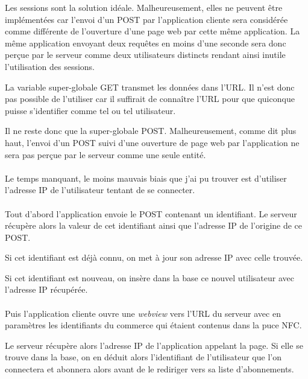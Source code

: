 \documentclass[a4paper,12pt,titlepage]{report}
\begin{document}
Les sessions sont la solution idéale. Malheureusement, elles ne peuvent être implémentées car l'envoi d'un POST par l'application cliente sera considérée comme différente de l'ouverture d'une page web par cette même application. La même application envoyant deux requêtes en moins d'une seconde sera donc perçue par le serveur comme deux utilisateurs distincts rendant ainsi inutile l'utilisation des sessions.

La variable super-globale GET transmet les données dans l'URL. Il n'est donc pas possible de l'utiliser car il suffirait de connaître l'URL pour que quiconque puisse s'identifier comme tel ou tel utilisateur.

Il ne reste donc que la super-globale POST. Malheureusement, comme dit plus haut, l'envoi d'un POST suivi d'une ouverture de page web par l'application ne sera pas perçue par le serveur comme une seule entité.
\paragraph*{}
Le temps manquant, le moins mauvais biais que j'ai pu trouver est d'utiliser l'adresse IP de l'utilisateur tentant de se connecter.

\paragraph*{}
Tout d'abord l'application envoie le POST contenant un identifiant. Le serveur récupère alors la valeur de cet identifiant ainsi que l'adresse IP de l'origine de ce POST.

Si cet identifiant est déjà connu, on met à jour son adresse IP avec celle trouvée.

Si cet identifiant est nouveau, on insère dans la base ce nouvel utilisateur avec l'adresse IP récupérée.

\paragraph*{}

Puis l'application cliente ouvre une \emph{webview} vers l'URL du serveur avec en paramètres les identifiants du commerce qui étaient contenus dans la puce NFC.

Le serveur récupère alors l'adresse IP de l'application appelant la page. Si elle se trouve dans la base, on en déduit alors l'identifiant de l'utilisateur que l'on connectera et abonnera alors avant de le rediriger vers sa liste d'abonnements.
\end{document}
